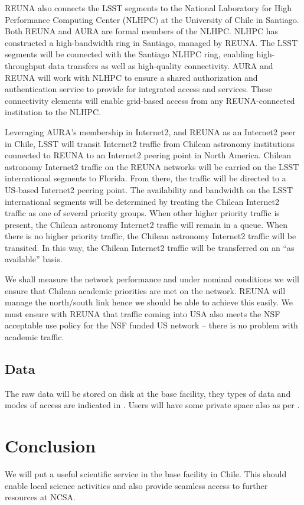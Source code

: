 REUNA also connects the LSST segments to the National Laboratory for High Performance Computing Center (NLHPC) at the University of Chile in Santiago.
Both REUNA and AURA are formal members of the NLHPC.
NLHPC has constructed a high-bandwidth ring in Santiago, managed by REUNA.
The LSST segments will be connected with the Santiago NLHPC ring, enabling high-throughput data transfers as well as high-quality connectivity.
AURA and REUNA will work with NLHPC to ensure a shared authorization and authentication service to provide for integrated access and services.
These connectivity elements will enable grid-based access from any REUNA-connected institution to the NLHPC.

Leveraging AURA’s membership in Internet2, and REUNA as an Internet2 peer in Chile, LSST will transit Internet2 traffic from Chilean astronomy institutions connected to REUNA to an Internet2 peering point in North America.
Chilean astronomy Internet2 traffic on the REUNA networks will be carried on the LSST international segments to Florida.
From there, the traffic will be directed to a US-based Internet2 peering point.
The availability and bandwidth on the LSST international segments will be determined by treating the Chilean Internet2 traffic as one of several priority groups.
When other higher priority traffic is present, the Chilean astronomy Internet2 traffic will remain in a queue.
When there is no higher priority traffic, the Chilean astronomy Internet2 traffic will be transited.
In this way, the Chilean Internet2 traffic will be transferred on an ``as available'' basis.

We shall measure the network performance and under nominal conditions we will ensure that Chilean academic priorities are met on the network.
REUNA will manage the north/south link hence we should be able to achieve this easily.
We must ensure with REUNA that traffic coming into USA also meets the NSF acceptable use policy for the NSF funded US network -- there is no problem with academic traffic.


\subsection{Data}
\label{sec:data}

The raw data will be stored on disk at the base facility, they types of data and modes of access are indicated in . Users will have some private space also as per .




\section{Conclusion}

We will put a useful scientific service in the base facility in Chile.
This should enable local science activities and also provide seamless access to further resources at NCSA.
